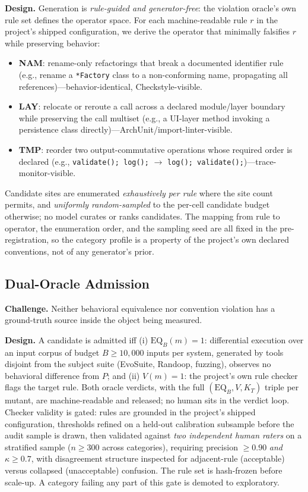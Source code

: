 \documentclass[conference]{IEEEtran}
\newcommand{\eqb}{\mathrm{EQ}_B}
\begin{document}
\textbf{Design.} Generation is \emph{rule-guided and generator-free}: the violation oracle's own rule set defines the operator space. For each machine-readable rule $r$ in the project's shipped configuration, we derive the operator that minimally falsifies $r$ while preserving behavior:
\begin{itemize}[leftmargin=1.2em]
\item \textbf{NAM}: rename-only refactorings that break a documented identifier rule (e.g., rename a \texttt{*Factory} class to a non-conforming name, propagating all references)---behavior-identical, Checkstyle-visible.
\item \textbf{LAY}: relocate or reroute a call across a declared module/layer boundary while preserving the call multiset (e.g., a UI-layer method invoking a persistence class directly)---ArchUnit/import-linter-visible.
\item \textbf{TMP}: reorder two output-commutative operations whose required order is declared (e.g., \texttt{validate(); log();} $\to$ \texttt{log(); validate();})---trace-monitor-visible.
\end{itemize}
Candidate sites are enumerated \emph{exhaustively per rule} where the site count permits, and \emph{uniformly random-sampled} to the per-cell candidate budget otherwise; no model curates or ranks candidates. The mapping from rule to operator, the enumeration order, and the sampling seed are all fixed in the pre-registration, so the category profile is a property of the project's own declared conventions, not of any generator's prior.

\subsection{Dual-Oracle Admission}\label{sec:dualoracle}

\textbf{Challenge.} Neither behavioral equivalence nor convention violation has a ground-truth source inside the object being measured.

\textbf{Design.} A candidate is admitted iff (i) $\eqb(m)=1$: differential execution over an input corpus of budget $B \geq 10{,}000$ inputs per system, generated by tools disjoint from the subject suite (EvoSuite, Randoop, fuzzing), observes no behavioral difference from $P$; and (ii) $V(m)=1$: the project's own rule checker flags the target rule. Both oracle verdicts, with the full $(\eqb, V, K_T)$ triple per mutant, are machine-readable and released; no human sits in the verdict loop. Checker validity is gated: rules are grounded in the project's shipped configuration, thresholds refined on a held-out calibration subsample before the audit sample is drawn, then validated against \emph{two independent human raters} on a stratified sample ($n \geq 300$ across categories), requiring precision $\geq 0.90$ \emph{and} $\kappa \geq 0.7$, with disagreement structure inspected for adjacent-rule (acceptable) versus collapsed (unacceptable) confusion. The rule set is hash-frozen before scale-up. A category failing any part of this gate is demoted to exploratory.
\end{document}
